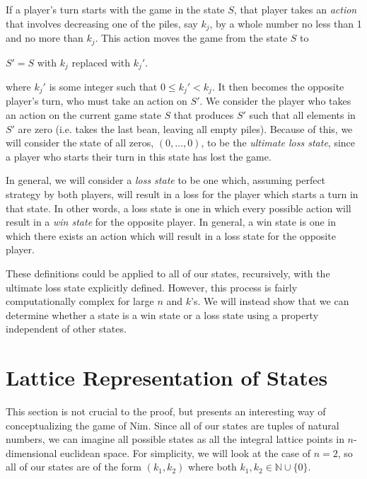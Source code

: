 \documentclass[12pt]{article}
\newcommand{\N}{\mathbb{N}}
\begin{document}
If a player's turn starts with the game in the state $S$, that player takes an \emph{action} that involves decreasing one of the piles, say $k_j$, by a whole number no less than 1 and no more than $k_j$. This action moves the game from the state $S$ to 
\begin{center}
    $S' = S$ with $k_j$ replaced with $k_j'$.
\end{center}
where $k_j'$ is some integer such that $0\leq k_j' < k_j$. It then becomes the opposite player's turn, who must take an action on $S'$. We consider the player who takes an action on the current game state $S$ that produces $S'$ such that all elements in $S'$ are zero (i.e. takes the last bean, leaving all empty piles). Because of this, we will consider the state of all zeros, $(0,\dots,0)$, to be the \emph{ultimate loss state}, since a player who starts their turn in this state has lost the game.

In general, we will consider a \emph{loss state} to be one which, assuming perfect strategy by both players, will result in a loss for the player which starts a turn in that state. In other words, a loss state is one in which every possible action will result in a \emph{win state} for the opposite player. In general, a win state is one in which there exists an action which will result in a loss state for the opposite player.

These definitions could be applied to all of our states, recursively, with the ultimate loss state explicitly defined. However, this process is fairly computationally complex for large $n$ and $k$'s. We will instead show that we can determine whether a state is a win state or a loss state using a property independent of other states.

\section{Lattice Representation of States}
This section is not crucial to the proof, but presents an interesting way of conceptualizing the game of Nim. Since all of our states are tuples of natural numbers, we can imagine all possible states as all the integral lattice points in $n$-dimensional euclidean space. For simplicity, we will look at the case of $n=2$, so all of our states are of the form $(k_1,k_2)$ where both $k_1,k_2 \in \N\cup\{0\}$.
\begin{center}
\end{center}
\end{document}
